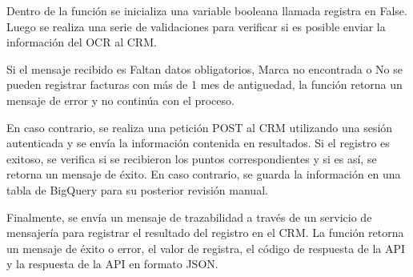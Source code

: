 \documentclass{article}
\begin{document}
Dentro de la función se inicializa una variable booleana llamada registra en False. Luego se realiza una serie de validaciones para verificar si es posible enviar la información del OCR al CRM.

Si el mensaje recibido es Faltan datos obligatorios, Marca no encontrada o No se pueden registrar facturas con más de 1 mes de antiguedad, la función retorna un mensaje de error y no continúa con el proceso.

En caso contrario, se realiza una petición POST al CRM utilizando una sesión autenticada y se envía la información contenida en resultados. Si el registro es exitoso, se verifica si se recibieron los puntos correspondientes y si es así, se retorna un mensaje de éxito. En caso contrario, se guarda la información en una tabla de BigQuery para su posterior revisión manual.

Finalmente, se envía un mensaje de trazabilidad a través de un servicio de mensajería para registrar el resultado del registro en el CRM. La función retorna un mensaje de éxito o error, el valor de registra, el código de respuesta de la API y la respuesta de la API en formato JSON.
\end{document}
